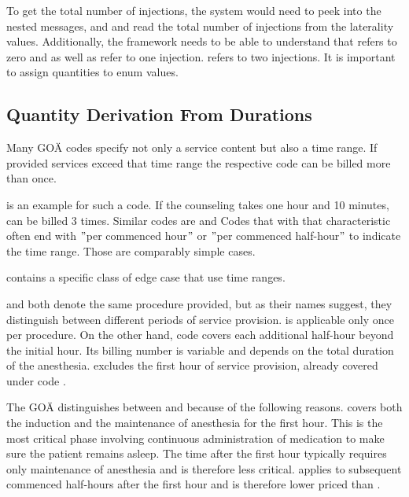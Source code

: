To get the total number of injections, the system would need to peek into the nested messages, and and read the total number of injections from the laterality values.
Additionally, the framework needs to be able to understand that  refers to zero and  as well as refer to one injection.
 refers to two injections.
It is important to assign quantities to enum values.

\subsection{Quantity Derivation From Durations}\label{subsec:quantity-derivation-from-durations}

Many GOÄ codes specify not only a service content but also a time range.
If provided services exceed that time range the respective code can be billed more than once.

 is an example for such a code.
If the counseling takes one hour and 10 minutes,  can be billed 3 times.
Similar codes are 
and 
Codes that with that characteristic often end with \("\)per commenced hour\("\) or \("\)per commenced half-hour\("\) to indicate the time range.
Those are comparably simple cases.

 contains a specific class of edge case that use time ranges.

 and 
both denote the same procedure provided, but as their names suggest, they distinguish between different periods of service provision.
 is applicable only once per procedure.
On the other hand, code  covers each additional half-hour beyond the initial hour.
Its billing number is variable and depends on the total duration of the anesthesia.
 excludes the first hour of service provision, already covered under code .

The GOÄ distinguishes between  and  because of the following reasons.
 covers both the induction and the maintenance of anesthesia for the first hour.
This is the most critical phase involving continuous administration of medication to make sure the patient remains asleep.
The time after the first hour typically requires only maintenance of anesthesia and is therefore less critical.
 applies to subsequent commenced half-hours after the first hour and is therefore lower priced than .


